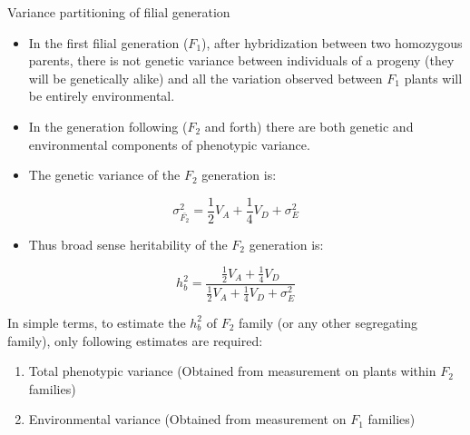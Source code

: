 \documentclass[11pt,dvipsnames,ignorenonframetext,aspectratio=169]{beamer}
\providecommand{\tightlist}{%
  \setlength{\itemsep}{0pt}\setlength{\parskip}{0pt}}
\begin{document}
\begin{frame}{Variance partitioning of filial generation}
\protect\hypertarget{variance-partitioning-of-filial-generation}{}
\begin{itemize}
\tightlist
\item
  In the first filial generation (\(F_1\)), after hybridization between
  two homozygous parents, there is not genetic variance between
  individuals of a progeny (they will be genetically alike) and all the
  variation observed between \(F_1\) plants will be entirely
  environmental.
\item
  In the generation following (\(F_2\) and forth) there are both genetic
  and environmental components of phenotypic variance.
\item
  The genetic variance of the \(F_2\) generation is:
\end{itemize}

\[
\sigma_{\bar{F_2}}^2 = \frac{1}{2}V_A + \frac{1}{4}V_D + \sigma_E^2
\]

\begin{itemize}
\tightlist
\item
  Thus broad sense heritability of the \(F_2\) generation is:
\end{itemize}

\[
h_b^2 = \frac{\frac{1}{2}V_A + \frac{1}{4}V_D}{\frac{1}{2}V_A + \frac{1}{4}V_D + \sigma_E^2}
\tag{iii}
\]
\end{frame}

\begin{frame}{}
\protect\hypertarget{section-17}{}
In simple terms, to estimate the \(h_b^2\) of \(F_2\) family (or any
other segregating family), only following estimates are required:

\begin{enumerate}
\tightlist
\item
  Total phenotypic variance (Obtained from measurement on plants within
  \(F_2\) families)
\item
  Environmental variance (Obtained from measurement on \(F_1\) families)
\end{enumerate}
\end{frame}
\end{document}
